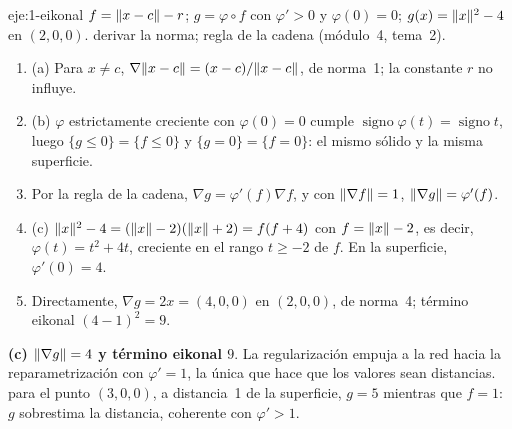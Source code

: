 \begin{solucion}{eje:1-eikonal}
\datos $f=\lVert x-c\rVert-r$; $g=\varphi\circ f$ con $\varphi'>0$ y $\varphi(0)=0$; $g(x)=\lVert x\rVert^2-4$ en $(2,0,0)$.
\planteamiento derivar la norma; regla de la cadena (módulo~4, tema~2).
\pasos
\begin{enumerate}[label=\arabic*.]
  \item (a) Para $x\ne c$, $\nabla\lVert x-c\rVert=(x-c)/\lVert x-c\rVert$, de norma~1; la constante $r$ no influye.
  \item (b) $\varphi$ estrictamente creciente con $\varphi(0)=0$ cumple $\operatorname{signo}\varphi(t)=\operatorname{signo}t$, luego $\{g\le 0\}=\{f\le 0\}$ y $\{g=0\}=\{f=0\}$: el mismo sólido y la misma superficie.
  \item Por la regla de la cadena, $\nabla g=\varphi'(f)\nabla f$, y con $\lVert\nabla f\rVert=1$, $\lVert\nabla g\rVert=\varphi'(f)$.
  \item (c) $\lVert x\rVert^2-4=(\lVert x\rVert-2)(\lVert x\rVert+2)=f(f+4)$ con $f=\lVert x\rVert-2$, es decir, $\varphi(t)=t^2+4t$, creciente en el rango $t\ge-2$ de $f$. En la superficie, $\varphi'(0)=4$.
  \item Directamente, $\nabla g=2x=(4,0,0)$ en $(2,0,0)$, de norma~4; término eikonal $(4-1)^2=9$.
\end{enumerate}
\resultado \textbf{(c) $\lVert\nabla g\rVert=4$ y término eikonal $9$}. La regularización empuja a la red hacia la reparametrización con $\varphi'=1$, la única que hace que los valores sean distancias.
\comprobacion para el punto $(3,0,0)$, a distancia~1 de la superficie, $g=5$ mientras que $f=1$: $g$ sobrestima la distancia, coherente con $\varphi'>1$.
\end{solucion}

